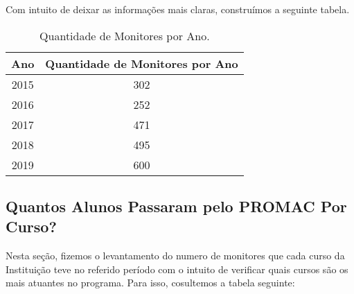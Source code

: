 \documentclass[12pt,a4paper]{article}
\begin{document}
    	Com intuito de deixar as informações mais claras, construímos a seguinte tabela.

			\begin{table}[!htb]
        	\begin{center}
            	\begin{tabular}{|c|c|}
                	\hline
                    Ano & Quantidade de Monitores por Ano\\ \hline
                    2015 & 302 \\ \hline
                    2016 & 252 \\ \hline
                    2017 & 471 \\ \hline
                    2018 & 495 \\ \hline
                    2019 & 600 \\ 
                	\hline
            	\end{tabular}
            	\caption{Quantidade de Monitores por Ano.}
            	\label{Tabela2}
        	\end{center}
    		\end{table}
    		
    	
		\subsection{Quantos Alunos Passaram pelo PROMAC Por Curso?}
		
		Nesta seção, fizemos o levantamento do numero de monitores que cada curso da Instituição teve no referido período com 		o intuito de verificar quais cursos são os mais atuantes no programa. Para isso, cosultemos a tabela seguinte:
		
\end{document}
